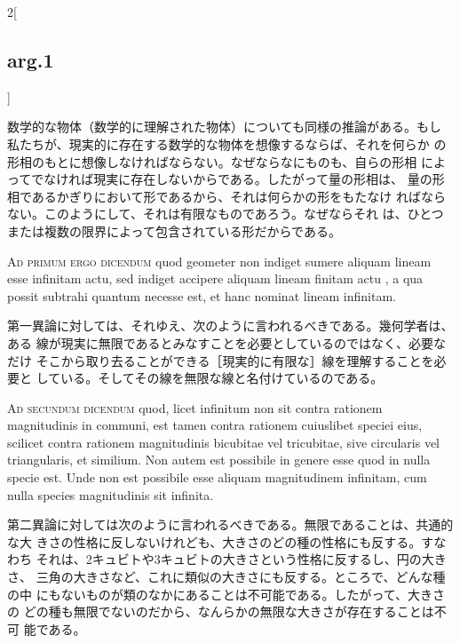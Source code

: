 \documentclass[paper=a4paper,fontsize=10pt,jafontsize=9pt,titlepage]{jlreq}
\begin{document}
\begin{paracol}{2}[\subsection{arg.1}]
\switchcolumn

数学的な物体（数学的に理解された物体）についても同様の推論がある。もし
 私たちが、現実的に存在する数学的な物体を想像するならば、それを何らか
 の形相のもとに想像しなければならない。なぜならなにものも、自らの形相
 によってでなければ現実に存在しないからである。したがって量の形相は、
 量の形相であるかぎりにおいて形であるから、それは何らかの形をもたなけ
 ればならない。このようにして、それは有限なものであろう。なぜならそれ
 は、ひとつまたは複数の限界によって包含されている形だからである。

\switchcolumn*[\subsection{ad.1}]

{\scshape Ad primum ergo dicendum} quod geometer  non indiget sumere aliquam lineam
 esse infinitam actu, sed indiget accipere aliquam lineam finitam actu ,
 a qua possit subtrahi quantum necesse est, et hanc nominat lineam
 infinitam.

\switchcolumn

第一異論に対しては、それゆえ、次のように言われるべきである。幾何学者は、ある
 線が現実に無限であるとみなすことを必要としているのではなく、必要なだけ
 そこから取り去ることができる［現実的に有限な］線を理解することを必要と
 している。そしてその線を無限な線と名付けているのである。

\switchcolumn*[\subsection{ad.2}]

{\scshape Ad secundum dicendum} quod, licet infinitum non sit contra rationem
 magnitudinis in communi, est tamen contra rationem cuiuslibet speciei
 eius, scilicet contra rationem magnitudinis bicubitae vel tricubitae,
 sive circularis vel triangularis, et similium. Non autem est possibile
 in genere esse quod in nulla specie est. Unde non est possibile esse
 aliquam magnitudinem infinitam, cum nulla species magnitudinis sit
 infinita.

\switchcolumn

第二異論に対しては次のように言われるべきである。無限であることは、共通的な大
 きさの性格に反しないけれども、大きさのどの種の性格にも反する。すなわち
 それは、2キュビトや3キュビトの大きさという性格に反するし、円の大きさ、
 三角の大きさなど、これに類似の大きさにも反する。ところで、どんな種の中
 にもないものが類のなかにあることは不可能である。したがって、大きさの
 どの種も無限でないのだから、なんらかの無限な大きさが存在することは不可
 能である。


\end{paracol}
\end{document}
